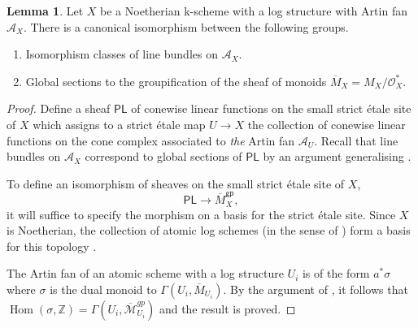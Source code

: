 \documentclass[11pt]{amsart}
\theoremstyle{definition}
\theoremstyle{definition}
\newtheorem{lemma}[theorem]{Lemma}
\newcommand{\cA}{\mathcal{A}}
\newcommand{\cM}{\mathcal{M}}
\newcommand{\cal}{\mathcal}
\def\cA{{\cal A}}
\def\cM{{\cal M}}
\begin{document}
\begin{lemma}\label{Lem:LBAfanMXgp}
    Let $X$ be a Noetherian k-scheme with a log structure with Artin fan $\mathcal{A}_X$. There is a canonical isomorphism between the following groups.
    \begin{enumerate}
        \item Isomorphism classes of line bundles on $\mathcal{A}_X$.
        \item Global sections to the groupification of the sheaf of monoids $\overline{M}_X = M_X/\mathcal{O}_X^\ast$.
    \end{enumerate}
\end{lemma}
\begin{proof}
    Define a sheaf $\mathsf{PL}$ of conewise linear functions on the small strict \'etale site of $X$ which assigns to a strict \'etale map $U\rightarrow X$ the collection of conewise linear functions on the cone complex associated to \textit{the} Artin fan $\mathcal{A}_U$. Recall that line bundles on $\cA_X$ correspond to global sections of $\mathsf{PL}$ by an argument generalising \cite[Theorem 0.1]{klyachko1989equivariant}. %
    
    To define an isomorphism of sheaves on the small strict \'etale site of $X$, $$\mathsf{PL}\longrightarrow \overline{M}_X^\mathsf{gp},$$ it will suffice to specify the morphism on a basis for the strict \'etale site. Since $X$ is Noetherian, the collection of atomic log schemes (in the sense of \cite[Definition 2.2.2.2]{MolchoWise}) form a basis for this topology \cite[Lemma 2.2.5]{AWbirational}. 

    The Artin fan of an atomic scheme with a log structure $U_i$ is of the form $a^\ast \sigma$ where $\sigma$ is the dual monoid to $\Gamma(U_i,\overline{M}_{U_i})$. By the argument of \cite[Lemma 2.2.5]{AWbirational}, it follows that $\operatorname{Hom}(\sigma,\mathbb{Z}) = \Gamma(U_i,\overline{\cM}_{U_i}^{gp})$ and the result is proved. %
\end{proof}
\end{document}

